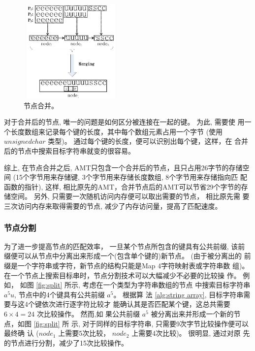 \begin{figure}[!h]
  \centering
  \includegraphics[height=2in, width=2in]{figures/2_MPM/node_merge}
  \caption{节点合并。}
  \label{fig:merge}
\end{figure}

对于合并后的节点, 唯一的问题是如何区分被连接在一起的键。 为此, 需要使
用一个长度数组来记录每个键的长度，其中每个数组元素占用一个字节 (使用
$unsigned char$ 类型)。 通过每个键的长度，便可以识别出每个键，这样，在
合并后的节点中搜索目标字符串就变的很容易。

综上, 在节点合并之后, AMT只包含一个合并后的节点，且只占用26字节的存储空
间 (15个字节用来存储键, 3个字节用来存储长度数组, 8个字节用来存储指向匹
配函数的指针), 这样, 相比原先的AMT，合并节点后的AMT可以节省29个字节的存
储空间。 另外, 只需要一次随机访问内存便可以取出需要的节点， 相比原先需
要三次访问内存来取得需要的节点, 减少了内存访问量，提高了匹配速度。


\subsubsection{节点分割}
\label{sec:node split}

为了进一步提高节点的匹配效率， 一旦某个节点所包含的键具有公共前缀, 该前
缀便可以从节点中分离出来形成一个(包含单个键的)新节点。 (由于被分离出的
前缀是一个字符串或字符，新节点的结构只能是Map 4字符映射表或字符串数
组)。 在一个节点上搜索目标串时，节点分割技术可以大幅减少不必要的比较操
作。 例如， 如图 \ref{fig:split} 所示, 考虑在一个类型为字符串数组的节点
中搜索目标字符串 $a^5u$, 节点中的4个键具有公共前缀 $a^5$。 根据算
法 \ref{alg:string array}, 目标字符串需要与这4个键依次进行逐字符比较才
能确认其是否匹配某个键，这总共需要 $6 \times 4 = 24$ 次比较操作。 然而,如
果公共前缀 $a^5$ 被分离出来并形成一个新的节点，如图 \ref{fig:split} 所
示, 对于同样的目标字符串, 只需要9次字节比较操作便可以最终确
认 ($node_1$ 上需要5次比较， $node_2$ 上需要4次比较)。 很明显, 通过对原
先的节点进行分割，减少了15次比较操作。

